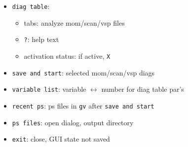\documentclass[10pt]{beamer}
\begin{document}
{\begin{frame}[fragile]
\begin{block}{}
\begin{itemize}
\item \verb|diag table|:\\
\vspace{-0.2cm}
\begin{itemize}
\item tabs: analyze mom/scan/vsp files
\item \verb|?|: help text
\item activation status: if active, \verb|X|
\end{itemize}
\vspace{-0.2cm}
\item \verb|save and start|: selected mom/scan/vsp diags
\item \verb|variable list|: variable $\leftrightarrow$ number for diag table par's
\item \verb|recent ps|: ps files in \verb|gv| after \verb|save and start|
\item \verb|ps files|: open dialog, output directory
\item \verb|exit|: close, GUI state not saved
\end{itemize}
\end{block}

\vspace{4cm}

\end{frame}
}

\end{document}
